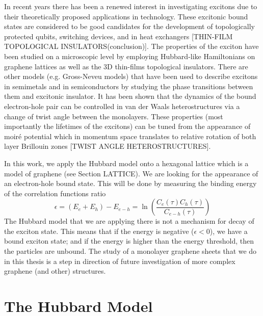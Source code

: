 In recent years there has been a renewed interest in investigating excitons due to their theoretically proposed applications in technology. These excitonic bound states are considered to be good candidates for the development of topologically protected qubits, switching devices, and in heat exchangers [THIN-FILM TOPOLOGICAL INSULATORS(conclusion)]. The properties of the exciton have been studied on a microscopic level by employing Hubbard-like Hamiltonians on graphene lattices as well as the 3D thin-films topological insulators. There are other models (e.g. Gross-Neveu models) that have been used to describe excitons in semimetals and in semiconductors by studying the phase transitions between them and excitonic insulator. It has been shown that the dynamics of the bound electron-hole pair can be controlled in van der Waals heterostructures via a change of twist angle between the monolayers. These properties (most importantly the lifetimes of the excitons) can be tuned from the appearance of moiré potential which in momentum space translates to relative rotation of both layer Brillouin zones [TWIST ANGLE HETEROSTRUCTURES].

In this work, we apply the Hubbard model onto a hexagonal lattice which is a model of graphene (see Section LATTICE). We are looking for the appearance of an electron-hole bound state. This will be done by measuring the binding energy of the correlation functions ratio
\begin{equation}
    \epsilon = (E_e + E_h) - E_{e-h} = \ln\left( \frac{C_e(\tau)C_h(\tau)}{C_{e-h}(\tau)} \right)
\end{equation}
The Hubbard model that we are applying there is not a mechanism for decay of the exciton state. This means that if the energy is negative ($\epsilon < 0$), we have a bound exciton state; and if the energy is higher than the energy threshold, then the particles are unbound. The study of a monolayer graphene sheets that we do in this thesis is a step in direction of future investigation of more complex graphene (and other) structures.


\section{The Hubbard Model}